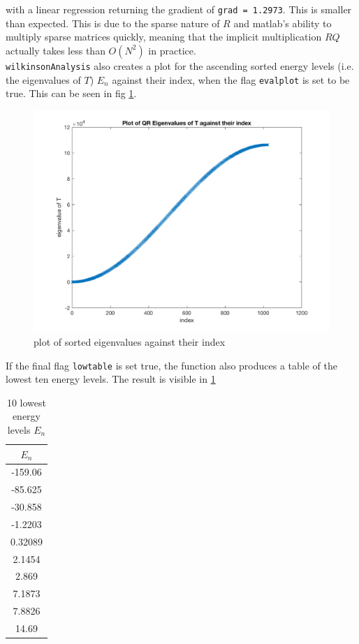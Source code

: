 \documentclass[paper=a4, fontsize=12pt]{scrartcl} %
\numberwithin{equation}{section}       %
\numberwithin{figure}{section}         %
\numberwithin{table}{section}          %
\begin{document}
\noindent with a linear regression returning the gradient of \texttt{grad = 1.2973}. This is smaller than expected. This is due to the sparse nature of $R$ and matlab's ability to multiply sparse matrices quickly, meaning that the implicit multiplication $RQ$ actually takes less than $O(N^2)$ in practice. \\

\texttt{wilkinsonAnalysis} also creates a plot for the ascending sorted energy levels (i.e. the eigenvalues of $T$) $E_n$ against their index, when the flag \texttt{evalplot} is set to be true. This can be seen in fig \ref{fig:evalplot}. \\

\begin{center}
	\begin{figure}[h!]
	  \includegraphics[width=\linewidth]{evalplot}
	  \caption{plot of sorted eigenvalues against their index}
	  \label{fig:evalplot}
	\end{figure}
\end{center}

If the final flag \texttt{lowtable} is set true, the function also produces a table of the lowest ten energy levels. The result is visible in \ref{table:1}
\begin{table}
	\begin{center}
		\begin{tabular}{c}
		     $E_n$ \\ 
			\hline 
		
		    -159.06 \\
		    -85.625 \\
		    -30.858 \\
		    -1.2203\\
		    0.32089\\
		     2.1454\\
		      2.869\\
		     7.1873\\
		     7.8826\\
		      14.69\\
		
		\end{tabular}
	\end{center}
	\caption{10 lowest energy levels $E_n$}
	\label{table:1}
\end{table}
\end{document}
